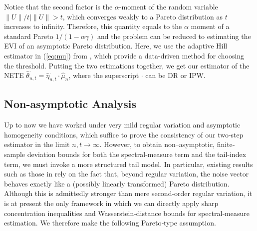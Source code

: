 \documentclass[12pt]{article}
\theoremstyle{plain}
\theoremstyle{definition}
\begin{document}
Notice that the second factor is the $\alpha$-moment of the random variable $\|U\|/ t \mid \|U\|> t$, which converges weakly to a Pareto distribution as $t$ increases to infinity. Therefore, this quantity equals to the $\alpha$ moment of a standard Pareto $ 1/(1-\alpha \gamma) $ and the problem can be reduced to estimating the EVI of an asymptotic Pareto distribution. Here, we use the adaptive Hill estimator in (\ref{eq:mu}) from {\cite{boucheron2015tail}}, which provide a data-driven method for choosing the threshold.  Putting the two estimations together, we get our estimator of the NETE $\hat{\theta}_{n, t}^{\cdot} = \hat{\eta}_{n, t}^{\cdot}
\cdot \hat{\mu}_n$, where the superscript ${\cdot}$ can be DR or IPW.


\subsection{Non-asymptotic Analysis}

Up to now we have worked under very
mild regular variation and asymptotic homogeneity conditions, which suffice to prove the consistency of our two‐step estimator in the limit $n, t \rightarrow
\infty$. However, to obtain non--asymptotic, finite‐sample deviation bounds for both the spectral‐measure term and the tail‐index term, we must invoke a more structured tail model.  In particular, existing results such as those in {\cite{zhang2023wasserstein}} rely on the fact that, beyond regular variation, the noise vector behaves exactly like a (possibly linearly transformed) Pareto distribution. Although this is admittedly stronger than
mere second‐order regular variation, it is at present the only framework in which we can directly apply sharp concentration inequalities and Wasserstein‐distance bounds for spectral‐measure estimation. We therefore make the following Pareto‐type assumption.
\end{document}

